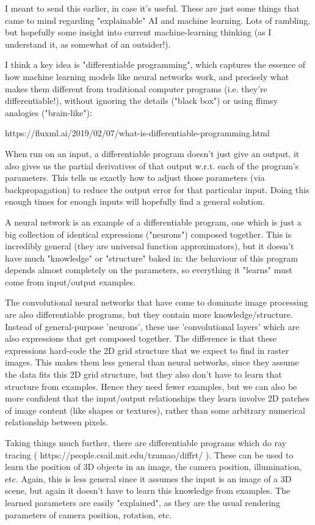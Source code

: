 \documentclass{article}
\begin{document}
I meant to send this earlier, in case it's useful. These are just some
things that came to mind regarding "explainable" AI and machine
learning. Lots of rambling, but hopefully some insight into current
machine-learning thinking (as I understand it, as somewhat of an
outsider!).

I think a key idea is "differentiable programming", which captures the
essence of how machine learning models like neural networks work, and
precisely what makes them different from traditional computer programs
(i.e. they're differentiable!), without ignoring the details ("black
box") or using flimsy analogies ("brain-like"):

https://fluxml.ai/2019/02/07/what-is-differentiable-programming.html

When run on an input, a differentiable program doesn't just give an
output, it also gives us the partial derivatives of that output
w.r.t. each of the program's parameters. This tells us exactly how to
adjust those parameters (via backpropagation) to reduce the output error
for that particular input. Doing this enough times for enough inputs
will hopefully find a general solution.

A neural network is an example of a differentiable program, one which is
just a big collection of identical expressions ("neurons") composed
together. This is incredibly general (they are universal function
approximators), but it doesn't have much "knowledge" or "structure"
baked in: the behaviour of this program depends almost completely on the
parameters, so everything it "learns" must come from input/output
examples.

The convolutional neural networks that have come to dominate image
processing are also differentiable programs, but they contain more
knowledge/structure. Instead of general-purpose 'neurons', these use
'convolutional layers' which are also expressions that get composed
together. The difference is that these expressions hard-code the 2D grid
structure that we expect to find in raster images. This makes them less
general than neural networks, since they assume the data fits this 2D
grid structure, but they also don't have to learn that structure from
examples. Hence they need fewer examples, but we can also be more
confident that the input/output relationships they learn involve 2D
patches of image content (like shapes or textures), rather than some
arbitrary numerical relationship between pixels.

Taking things much further, there are differentiable programs which do
ray tracing ( https://people.csail.mit.edu/tzumao/diffrt/ ). These can
be used to learn the position of 3D objects in an image, the camera
position, illumination, etc. Again, this is less general since it
assumes the input is an image of a 3D scene, but again it doesn't have
to learn this knowledge from examples. The learned parameters are easily
"explained", as they are the usual rendering parameters of camera
position, rotation, etc.
\end{document}
